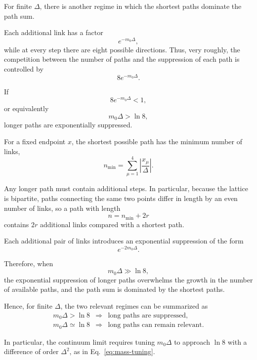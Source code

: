\documentclass[12pt,a4paper]{article}
\begin{document}
For finite $\Delta$, there is another regime in which the shortest paths
dominate the path sum.

Each additional link has a factor
\[
e^{-m_0\Delta},
\]
while at every step there are eight possible directions. Thus, very roughly,
the competition between the number of paths and the suppression of each path
is controlled by
\begin{equation}
8e^{-m_0\Delta}.
\end{equation}

If
\begin{equation}
8e^{-m_0\Delta}<1,
\end{equation}
or equivalently
\begin{equation}
m_0\Delta>\ln8,
\label{eq:shortestcondition}
\end{equation}
longer paths are exponentially suppressed.

For a fixed endpoint $x$, the shortest possible path has the minimum number
of links,
\begin{equation}
n_{\min}
=
\sum_{\mu=1}^{4}
\left|\frac{x_\mu}{\Delta}\right|.
\end{equation}

Any longer path must contain additional steps. In particular, because the
lattice is bipartite, paths connecting the same two points differ in length
by an even number of links, so a path with length
\[
n=n_{\min}+2r
\]
contains $2r$ additional links compared with a shortest path.

Each additional pair of links introduces an exponential suppression of the
form
\[
e^{-2m_0\Delta}.
\]

Therefore, when
\[
m_0\Delta\gg\ln8,
\]
the exponential suppression of longer paths overwhelms the growth in the
number of available paths, and the path sum is dominated by the shortest
paths.

Hence, for finite $\Delta$, the two relevant regimes can be summarized as
\begin{equation}
\begin{array}{ccl}
m_0\Delta>\ln8
&\Longrightarrow&
\text{long paths are suppressed,}\\[0.2cm]
m_0\Delta\simeq\ln8
&\Longrightarrow&
\text{long paths can remain relevant.}
\end{array}
\end{equation}

In particular, the continuum limit requires tuning $m_0\Delta$ to approach
$\ln8$ with a difference of order $\Delta^2$, as in
Eq.~\eqref{eq:mass-tuning}.
\end{document}
